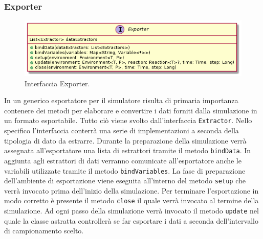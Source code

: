 \documentclass[12pt,a4paper,openright,oneside]{book}
\begin{document}
\subsubsection{Exporter}
\begin{figure}
	\centering
	\includegraphics[width=1\linewidth]{images/exporter.png}
	\caption{Interfaccia Exporter.}
	\label{fig:exporter}
\end{figure}
In un generico esportatore per il simulatore risulta di primaria importanza contenere dei metodi per elaborare e convertire i dati forniti dalla simulazione in un formato esportabile. Tutto ciò viene svolto dall'interfaccia \texttt{Extractor}. Nello specifico l'interfaccia conterrà una serie di implementazioni a seconda della tipologia di dato da estrarre. Durante la preparazione della simulazione verrà assegnata all'esportatore una lista di estrattori tramite il metodo \texttt{bindData}. In aggiunta agli estrattori di dati verranno comunicate all'esportatore anche le variabili utilizzate tramite il metodo \texttt{bindVariables}.
La fase di preparazione dell'ambiente di esportazione viene eseguita all'interno del metodo \texttt{setup} che verrà invocato prima dell'inizio della simulazione.
Per terminare l'esportazione in modo corretto è presente il metodo \texttt{close} il quale verrà invocato al termine della simulazione.
Ad ogni passo della simulazione verrà invocato il metodo \texttt{update} nel quale la classe astratta controllerà se far esportare i dati a seconda dell'intervallo di campionamento scelto.
\end{document}
